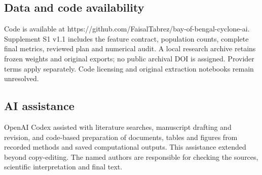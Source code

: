\documentclass[pdflatex,sn-mathphys-num,referee,a4paper]{sn-jnl}
\begin{document}
\subsection*{Data and code availability}
Code is available at https://github.com/FaisalTabrez/bay-of-bengal-cyclone-ai. Supplement S1 v1.1 includes the feature contract, population counts, complete final metrics, reviewed plan and numerical audit. A local research archive retains frozen weights and original exports; no public archival DOI is assigned. Provider terms apply separately. Code licensing and original extraction notebooks remain unresolved.

\subsection*{AI assistance}
OpenAI Codex assisted with literature searches, manuscript drafting and revision, and code-based preparation of documents, tables and figures from recorded methods and saved computational outputs. This assistance extended beyond copy-editing. The named authors are responsible for checking the sources, scientific interpretation and final text.
\end{document}
